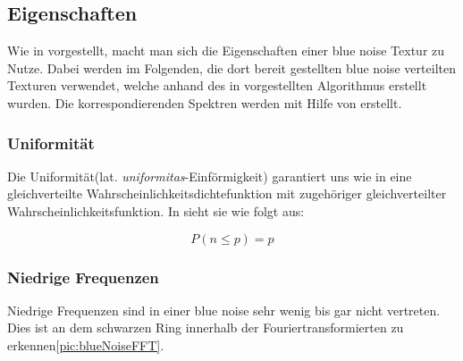 \subsection{Eigenschaften}

Wie in \cite{Pet17} vorgestellt, macht man sich die Eigenschaften einer
blue noise Textur zu Nutze. Dabei werden im Folgenden, die dort bereit 
gestellten blue noise verteilten Texturen verwendet, welche anhand des in
\cite{ulichney1993void} vorgestellten Algorithmus erstellt wurden.
Die korrespondierenden Spektren werden mit Hilfe von \cite{FFTProgWeb} erstellt.

\subsubsection{Uniformität}
Die Uniformität(lat. \textit{uniformitas}-Einförmigkeit) garantiert uns 
wie in \cite{3288} eine gleichverteilte Wahrscheinlichkeitsdichtefunktion
mit zugehöriger gleichverteilter Wahrscheinlichkeitsfunktion. In \cite{Pet17}
sieht sie wie folgt aus: 

\begin{equation}\label{eq:uniformität}
    P(n \leq p) = p
\end{equation}

\subsubsection{Niedrige Frequenzen}
Niedrige Frequenzen sind in einer blue noise sehr wenig bis gar nicht 
vertreten. Dies ist an dem schwarzen Ring innerhalb der Fouriertransformierten
zu erkennen\ref{pic:blueNoiseFFT}.

